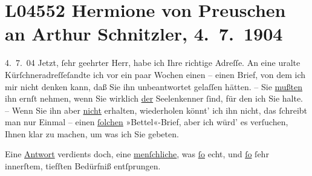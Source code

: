 

\section[Hermione von Preuschen an Arthur Schnitzler, 4. 7. 1904]{L04552 Hermione von Preuschen an Arthur Schnitzler, 4. 7. 1904}
\nopagebreak{}
\rehead{ }\normalsize\beginnumbering{}
\toendnotes[C]{\smallbreak\pagebreak[2]}
\toendnotes[C]{\smallbreak}
\toendnotes[C]{\smallbreak}
\pstart
           {\pb}4. 7. 04\pend
           \vspace{0.5em}
\pstart
           Jetzt, ſehr geehrter Herr, habe ich Ihre richtige Adreſſe. An eine
               uralte Kürſchneradreſſeſandte ich vor ein paar Wochen einen \label{K_L04552-1v}\label{K_L04552-1} – einen Brief, von dem ich
               mir nicht denken kann, daß Sie ihn unbeantwortet gelaſſen hätten. – Sie \uline{mußten} ihn ernſt nehmen, wenn Sie wirklich \uline{der} Seelenkenner{ }ſind, für den ich Sie halte. – Wenn
               Sie ihn aber \uline{nicht} erhalten, wiederholen könnt’ ich
               ihn nicht, das{ }ſchreibt man nur Einmal – einen {\pb}\uline{ſolchen} »Bettel«-Brief, aber ich würd’ es verſuchen,
               Ihnen klar zu machen, um was ich Sie gebeten.\pend
           
\pstart
           Eine \uline{Antwort} verdients doch, eine \uline{menſchliche}, was \uline{ſo}
               echt, und \uline{ſo}{ }ſehr innerſtem, tiefſten Bedürfniß
               entſprungen.\pend
           
